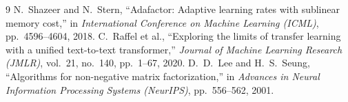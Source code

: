 \documentclass[11pt,a4paper]{article}
\theoremstyle{definition}
\begin{document}
\begin{thebibliography}{9}
 N.~Shazeer and N.~Stern, ``Adafactor: Adaptive learning rates with sublinear memory cost,'' in \emph{International Conference on Machine Learning (ICML)}, pp.~4596--4604, 2018.
 C.~Raffel et al., ``Exploring the limits of transfer learning with a unified text-to-text transformer,'' \emph{Journal of Machine Learning Research (JMLR)}, vol.~21, no.~140, pp.~1--67, 2020.
 D.~D.~Lee and H.~S.~Seung, ``Algorithms for non-negative matrix factorization,'' in \emph{Advances in Neural Information Processing Systems (NeurIPS)}, pp.~556--562, 2001.
\end{thebibliography}
\end{document}
